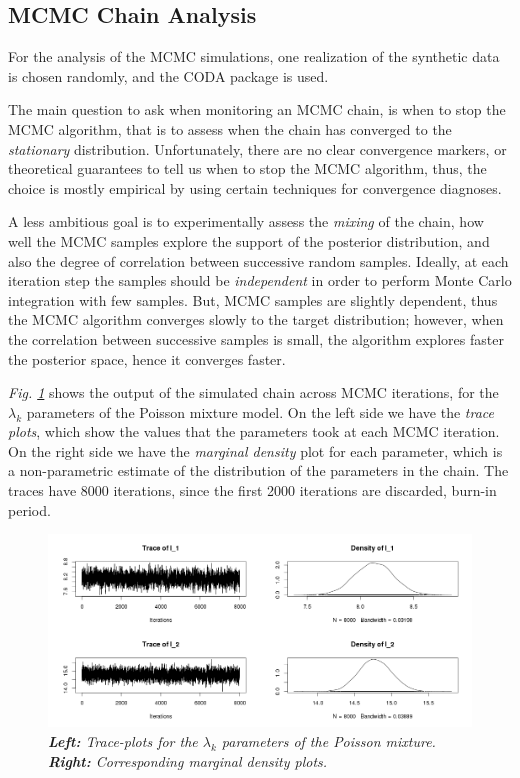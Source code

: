 \subsection{MCMC Chain Analysis} \label{integr-synth-chain-sect}
For the analysis of the MCMC simulations, one realization of the synthetic data is chosen randomly, and the CODA package \citep{Plummer2006} is used. 

The main question to ask when monitoring an MCMC chain, is when to stop the MCMC algorithm, that is to assess when the chain has converged to the \emph{stationary} distribution. Unfortunately, there are no clear convergence markers, or theoretical guarantees to tell us when to stop the MCMC algorithm, thus, the choice is mostly empirical by using certain techniques for convergence diagnoses.

A less ambitious goal is to experimentally assess the \emph{mixing} of the chain, \ie how well the MCMC samples explore the support of the posterior distribution, and also the degree of correlation between successive random samples. Ideally, at each iteration step the samples should be \emph{independent} in order to perform Monte Carlo integration with few samples. But, MCMC samples are slightly dependent, thus the MCMC algorithm converges slowly to the target distribution; however, when the correlation between successive samples is small, the algorithm explores faster the posterior space, hence it converges faster.

\emph{Fig. \ref{trace-density-l-pic}} shows the output of the simulated chain across MCMC iterations, for the $\lambda_{k}$ parameters of the Poisson mixture model. On the left side we have the \emph{trace plots}, which show the values that the parameters took at each MCMC iteration. On the right side we have the \emph{marginal density} plot for each parameter, which is a non-parametric estimate of the distribution of the parameters in the chain. The traces have 8000 iterations, since the first 2000 iterations are discarded, \ie burn-in period.
\begin{figure}[!ht]
\begin{center}
 \includegraphics[scale = 0.40]{images/traceDensityL.png}
\caption{\emph{\textbf{Left:} Trace-plots for the $\lambda_{k}$ parameters of the Poisson mixture. \textbf{Right:} Corresponding marginal density plots.}}
\label{trace-density-l-pic}
\end{center}
\end{figure}


